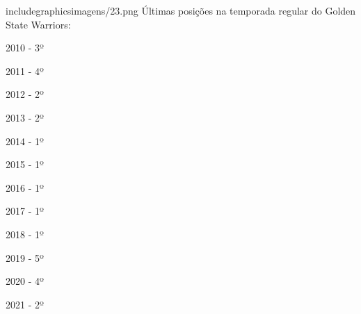 \documentclass[
]{book}
\begin{document}
includegraphics{imagens/23.png} Últimas posições na temporada regular do Golden State Warriors:

2010 - 3º

2011 - 4º

2012 - 2º

2013 - 2º

2014 - 1º

2015 - 1º

2016 - 1º

2017 - 1º

2018 - 1º

2019 - 5º

2020 - 4º

2021 - 2º
\end{document}
